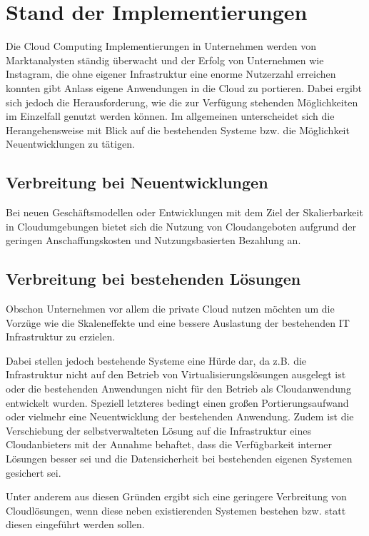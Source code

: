 \section{Stand der Implementierungen}
\label{sec_implementations}
Die Cloud Computing Implementierungen in Unternehmen werden von Marktanalysten ständig überwacht und der Erfolg von Unternehmen wie Instagram, die ohne eigener Infrastruktur eine enorme Nutzerzahl erreichen konnten gibt Anlass eigene Anwendungen in die Cloud zu portieren. Dabei ergibt sich jedoch die Herausforderung, wie die zur Verfügung stehenden Möglichkeiten im Einzelfall genutzt werden können. Im allgemeinen unterscheidet sich die Herangehensweise mit Blick auf die bestehenden Systeme bzw. die Möglichkeit Neuentwicklungen zu tätigen.

\subsection{Verbreitung bei Neuentwicklungen}
Bei neuen Geschäftsmodellen oder Entwicklungen mit dem Ziel der Skalierbarkeit in Cloudumgebungen bietet sich die Nutzung von Cloudangeboten aufgrund der geringen Anschaffungskosten und Nutzungsbasierten Bezahlung an. \cite{gigaOm}

\subsection{Verbreitung bei bestehenden Lösungen}
Obschon Unternehmen vor allem die private Cloud nutzen möchten um die Vorzüge wie die Skaleneffekte und eine bessere Auslastung der bestehenden IT Infrastruktur zu erzielen. 

Dabei stellen jedoch bestehende Systeme eine Hürde dar, da z.B. die Infrastruktur nicht auf den Betrieb von Virtualisierungslösungen ausgelegt ist oder die bestehenden Anwendungen nicht für den Betrieb als Cloudanwendung entwickelt wurden. Speziell letzteres bedingt einen großen Portierungsaufwand oder vielmehr eine Neuentwicklung der bestehenden Anwendung. Zudem ist die Verschiebung der selbstverwalteten Lösung auf die Infrastruktur eines Cloudanbieters mit der Annahme behaftet, dass die Verfügbarkeit interner Lösungen besser sei und die Datensicherheit bei bestehenden eigenen Systemen gesichert sei. \cite{gigaOm}

Unter anderem aus diesen Gründen ergibt sich eine geringere Verbreitung von Cloudlösungen, wenn diese neben existierenden Systemen bestehen bzw. statt diesen eingeführt werden sollen.

